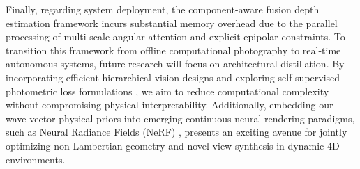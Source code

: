 \documentclass[lettersize,journal]{IEEEtran}
\begin{document}
Finally, regarding system deployment, the component-aware fusion depth estimation framework incurs substantial memory overhead due to the parallel processing of multi-scale angular attention and explicit epipolar constraints. To transition this framework from offline computational photography to real-time autonomous systems, future research will focus on architectural distillation. By incorporating efficient hierarchical vision designs \cite{liu2021} and exploring self-supervised photometric loss formulations \cite{godard2019}, we aim to reduce computational complexity without compromising physical interpretability. Additionally, embedding our wave-vector physical priors into emerging continuous neural rendering paradigms, such as Neural Radiance Fields (NeRF) \cite{ng2022}, presents an exciting avenue for jointly optimizing non-Lambertian geometry and novel view synthesis in dynamic 4D environments.



\end{document}
